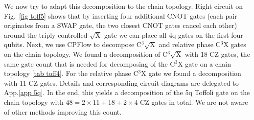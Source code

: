\documentclass[twocolumn, amsfonts, amssymb, aps, nofootinbib]{revtex4-2}
\newcommand{\CZ}{\textsf{CZ }}
\newcommand{\CX}{\textsf{CNOT }}
\newcommand{\cx}[1]{C${}^{#1}$X}
\newcommand{\package}[1]{\textrm {#1 }}
\newcommand{\cpflow}{\package{CPFlow}}
\begin{document}
We now try to adapt this decomposition to the chain topology. Right circuit on Fig.~\ref{fig toff5} shows that by inserting four additional \CX gates (each pair originates from a SWAP gate, the two closest \CX gates cancel each other) around the triply controlled $\sqrt{\text{X}}$ gate we can place all 4q gates on the first four qubits. Next, we use \cpflow to decompose C${}^{3}\sqrt{\text{X}}$ and relative phase \cx{3} gates on the chain topology. We found a decomposition of C${}^{3}\sqrt{\text{X}}$ with 18 \CZ gates, the same gate count that is needed for decomposing of the \cx{3} gate on a chain topology \ref{tab toff4}. For the relative phase \cx{3} gate we found a decomposition with 11 \CZ gates. Details and corresponding circuit diagrams are delegated to App.\ref{app 5q}. In the end, this yields a decomposition of the 5q Toffoli gate on the chain topology with $48=2\times 11+18+2\times4$ \CZ gates in total. We are not aware of other methods improving this count.
\end{document}

